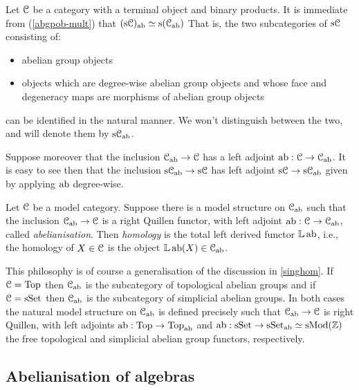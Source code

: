 \begin{nothing}
  \label{simplab}
  Let $\mathcal{C}$ be a category with a terminal object and binary
  products. It is immediate from (\ref{abgpob-mult}) that
  $(\mathrm{s}\mathcal{C})_{\operatorname{ab}} \simeq \mathrm{s}(\mathcal{C}_{\operatorname{ab}})$ That is, the two subcategories of
  $\mathrm{s}\mathcal{C}$ consisting of:
  \begin{itemize}
  \item abelian group objects
  \item objects which are degree-wise abelian group objects and whose
    face and degeneracy maps are morphisms of abelian group objects
  \end{itemize}
  can be identified in the natural manner. We won't distinguish
  between the two, and will denote them by $\mathrm{s}\mathcal{C}_{\operatorname{ab}}$.

  Suppose moreover that the inclusion $\mathcal{C}_{\operatorname{ab}} \to \mathcal{C}$ has a left
  adjoint $\operatorname{ab} : \mathcal{C} \to \mathcal{C}_{\operatorname{ab}}$. It is easy to see then that the
  inclusion $\mathrm{s}\mathcal{C}_{\operatorname{ab}} \to \mathrm{s}\mathcal{C}$ has left adjoint $\mathrm{s}\mathcal{C} \to
  \mathrm{s}\mathcal{C}_{\operatorname{ab}}$ given by applying $\operatorname{ab}$ degree-wise.
\end{nothing}

\begin{definition}
  \label{derivedab}
  Let $\mathcal{C}$ be a model category. Suppose there is a model structure on
  $\mathcal{C}_{\operatorname{ab}}$ such that the inclusion $\mathcal{C}_{\operatorname{ab}} \to \mathcal{C}$ is a right
  Quillen functor, with left adjoint $\operatorname{ab} : \mathcal{C} \to \mathcal{C}_{\operatorname{ab}}$, called
  \emph{abelianisation}. Then \emph{homology} is the total left
  derived functor $\mathbb{L} \operatorname{ab}$, i.e., the homology of $X \in \mathcal{C}$ is the
  object $\mathbb{L} \operatorname{ab}(X) \in \mathcal{C}_{\operatorname{ab}}$.
\end{definition}

\begin{examples}
  This philosophy is of course a generalisation of the discussion in
  \textsection\ref{singhom}. If $\mathcal{C} = \mathrm{Top}$ then $\mathcal{C}_{\operatorname{ab}}$ is the
  subcategory of topological abelian groups and if $\mathcal{C} = \mathrm{s}\mathrm{Set}$ then
  $\mathcal{C}_{\operatorname{ab}}$ is the subcategory of simplicial abelian groups. In both
  cases the natural model structure on $\mathcal{C}_{\operatorname{ab}}$ is defined precisely
  such that $\mathcal{C}_{\operatorname{ab}} \to \mathcal{C}$ is right Quillen, with left adjoints
  $\operatorname{ab} : \mathrm{Top} \to \mathrm{Top}_{\operatorname{ab}}$ and $\operatorname{ab} : \mathrm{s}\mathrm{Set} \to \mathrm{s}\mathrm{Set}_{\operatorname{ab}}
  \simeq \mathrm{s}\mathrm{Mod}(\mathbb{Z})$ the free topological and simplicial abelian group
  functors, respectively.
\end{examples}

\subsection{Abelianisation of algebras}
\label{abelianalgebra}

